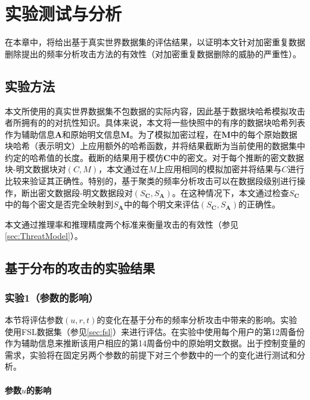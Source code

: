 \chapter{实验测试与分析}
\label{sec:Experiment}

在本章中，将给出基于真实世界数据集的评估结果，以证明本文针对加密重复数据删除提出的频率分析攻击方法的有效性（对加密重复数据删除的威胁的严重性）。

\section{实验方法}
\label{sec:dataset}

本文所使用的真实世界数据集不包数据的实际内容，因此基于数据块哈希模拟攻击者所拥有的的对抗性知识。具体来说，本文将一些快照中的有序的数据块哈希列表作为辅助信息$\mathbf{A}$和原始明文信息$\mathbf{M}$。为了模拟加密过程，在$\mathbf{M}$中的每个原始数据块哈希（表示明文）上应用额外的哈希函数，并将结果截断为当前使用的数据集中约定的哈希值的长度。截断的结果用于模仿$\mathbf{C}$中的密文。对于每个推断的密文数据块-明文数据块对$(C,M)$，本文通过在$M$上应用相同的模拟加密并将结果与​​$C$进行比较来验证其正确性。特别的，基于聚类的频率分析攻击可以在数据段级别进行操作，断出密文数据段-明文数据段对$(S_\mathbf{C},S_\mathbf {A})$。在这种情况下，本文通过检查$S_\mathbf{C}$中的每个密文是否完全映射到$S_\mathbf{A}$中的每个明文来评估$(S_\mathbf {C},S_\mathbf{A})$的正确性。

本文通过推理率和推理精度两个标准来衡量攻击的有效性（参见\ref{sec:ThreatModel}）。


\section{基于分布的攻击的实验结果}
\label{sec:experiment-distribution}

\subsection{实验1（参数的影响）}
\label{sec:exp1}

本节将评估参数$(u, r, t)$的变化在基于分布的频率分析攻击中带来的影响。实验使用FSL数据集（参见\ref{sec:fsl}）来进行评估。在实验中使用每个用户的第12周备份作为辅助信息来推断该用户相应的第14周备份中的原始明文数据。出于控制变量的需求，实验将在固定另两个参数的前提下对三个参数中的一个的变化进行测试和分析。


\subsubsection{参数$u$的影响}


